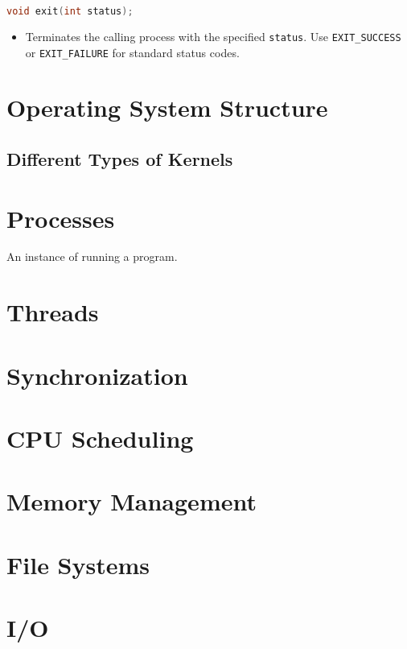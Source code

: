 \documentclass[twoside]{article}
\begin{document}
\begin{summary}
\begin{lstlisting}[language=C]
void exit(int status);
\end{lstlisting}
    \begin{itemize}
        \item Terminates the calling process with the specified \texttt{status}. Use \texttt{EXIT\_SUCCESS} or \texttt{EXIT\_FAILURE} for standard status codes.
    \end{itemize}
\end{summary}
\cleardoublepage

\section{Operating System Structure}

\subsection{Different Types of Kernels}

\section{Processes}
\begin{definition}
    An instance of running a program.
\end{definition}

\section{Threads}

\section{Synchronization}

\section{CPU Scheduling}

\section{Memory Management}

\section{File Systems}

\section{I/O}
\end{document}
